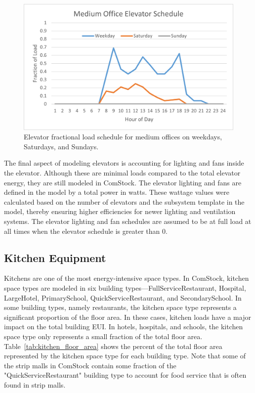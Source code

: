 \begin{figure}[ht!]
    \centering 
    \includegraphics[]{figures/medium_office_elevator.png}
    \caption[Medium office elevator schedule]{Elevator fractional load schedule for medium offices on weekdays, Saturdays, and Sundays.}
    \label{fig:medium_office_elevator_schedule}
\end{figure}

The final aspect of modeling elevators is accounting for lighting and fans inside the elevator. Although these are minimal loads compared to the total elevator energy, they are still modeled in ComStock. The elevator lighting and fans are defined in the model by a total power in watts. These wattage values were calculated based on the number of elevators and the subsystem template in the model, thereby ensuring higher efficiencies for newer lighting and ventilation systems. The elevator lighting and fan schedules are assumed to be at full load at all times when the elevator schedule is greater than 0.

\pagebreak

\subsection{Kitchen Equipment} 
Kitchens are one of the most energy-intensive space types. In ComStock, kitchen space types are modeled in six building types---FullServiceRestaurant, Hospital, LargeHotel, PrimarySchool, QuickServiceRestaurant, and SecondarySchool. In some building types, namely restaurants, the kitchen space type represents a significant proportion of the floor area. In these cases, kitchen loads have a major impact on the total building EUI. In hotels, hospitals, and schools, the kitchen space type only represents a small fraction of the total floor area. Table~\ref{tab:kitchen_floor_area} shows the percent of the total floor area represented by the kitchen space type for each building type. Note that some of the strip malls in ComStock contain some fraction of the "QuickServiceRestaurant" building type to account for food service that is often found in strip malls. 

